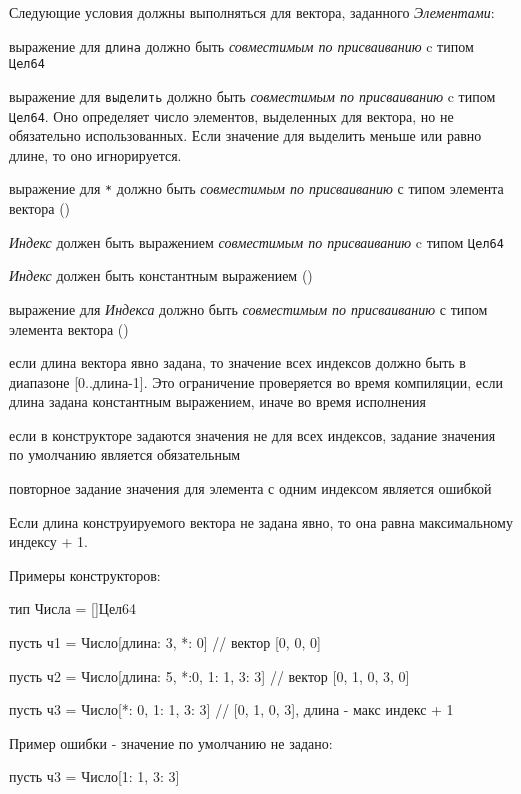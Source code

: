 \bigskip
Следующие условия должны выполняться для вектора, заданного \emph{Элементами}:
\begin{d_itemize}
\item
    выражение для \verb+длина+ должно быть \emph{совместимым по присваиванию} c типом \verb|Цел64|
\item
    выражение для \verb+выделить+ должно быть \emph{совместимым по присваиванию} c типом \verb|Цел64|. 
    Оно определяет число элементов, выделенных для вектора, но не обязательно использованных.
    Если значение для выделить меньше или равно длине, то оно игнорируется.
\item
    выражение для \verb+*+ должно быть \emph{совместимым по присваиванию} с типом элемента вектора () 
\item
    \emph{Индекс} должен быть выражением  \emph{совместимым по присваиванию} c типом \verb|Цел64|
\item
    \emph{Индекс} должен быть константным выражением ()
\item
    выражение для \emph{Индекса} должно быть \emph{совместимым по присваиванию} с типом элемента вектора ()
\item
    если длина вектора явно задана, то значение всех индексов должно быть в диапазоне [0..длина-1]. 
    Это ограничение проверяется во время компиляции, если длина задана константным выражением, иначе во время исполнения
\item
    если в конструкторе задаются значения не для всех индексов, задание значения по умолчанию является обязательным
\item
    повторное задание значения для элемента с одним индексом является ошибкой
\end{d_itemize}

Если длина конструируемого вектора не задана явно, то она равна максимальному индексу + 1.

\bigskip
Примеры конструкторов:
\begin{Trivil}[vspace=2pt]
тип Числа = []Цел64

пусть ч1 = Число[длина: 3, *: 0] 
// вектор [0, 0, 0]

пусть ч2 = Число[длина: 5, *:0, 1: 1, 3: 3] 
// вектор [0, 1, 0, 3, 0]

пусть ч3 = Число[*: 0, 1: 1, 3: 3]  
// [0, 1, 0, 3], длина - макс индекс + 1
\end{Trivil}

Пример ошибки - значение по умолчанию не задано:
\begin{SampleErr}[vspace=2pt]
пусть ч3 = Число[1: 1, 3: 3]  
\end{SampleErr}

